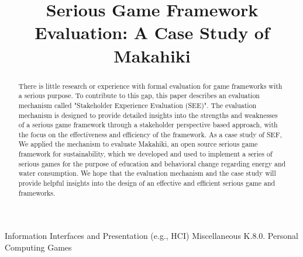 \documentclass{sigchi}
\begin{document}
\title{Serious Game Framework Evaluation: A Case Study of Makahiki}


\maketitle

\begin{abstract}
There is little research or experience with formal evaluation for game frameworks with a serious purpose. To contribute to this gap, this paper describes an evaluation mechanism called "Stakeholder Experience Evaluation (SEE)". The evaluation mechanism is designed to provide detailed insights into the strengths and weaknesses of a serious game framework through a stakeholder perspective based approach, with the focus on the effectiveness and efficiency of the framework. As a case study of SEF, We applied the mechanism to evaluate Makahiki, an open source serious game framework for sustainability, which we developed and used to implement a series of serious games for the purpose of education and behavioral change regarding energy and water consumption. We hope that the evaluation mechanism and the case study will provide helpful insights into the design of an effective and efficient serious game and frameworks.

\end{abstract}


 {Information Interfaces and Presentation (e.g., HCI)} {Miscellaneous}
 {K.8.0.} {Personal Computing} {Games}

\end{document}
